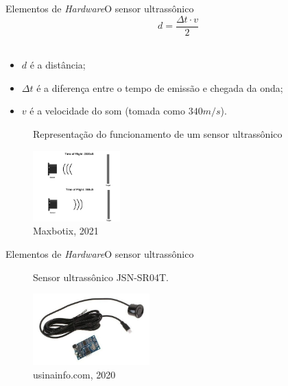 \begin{frame}{Elementos de \textit{Hardware}}{O sensor ultrassônico}
    \begin{equation}
        d = \frac{\Delta t \cdot v}{2}
        \end{equation}
        \\
        \begin{itemize}
            
            \item $d$ é a distância;
            \item $\Delta t$ é a diferença entre o tempo de emissão e chegada da onda;
            \item  $v$ é a velocidade do som (tomada como $340m/s$). \\
        \end{itemize}

        \begin{figure}[H]
            \centering
            \caption{Representação do funcionamento de um sensor ultrassônico}
            \includegraphics[width=0.3\textwidth]{figuras/ultrassonico_operacao.png}
            \caption*{\tiny{Maxbotix, 2021}}
            \label{fig:operacao_ultrassonico}
        \end{figure}
        
\end{frame}

\begin{frame}{Elementos de \textit{Hardware}}{O sensor ultrassônico}
  
\begin{figure}[H]
	\centering
	\caption{Sensor ultrassônico JSN-SR04T.}
	\includegraphics[width=0.4\textwidth]{figuras/sensor_ultra.jpg}
	\caption*{\tiny{usinainfo.com}, 2020}
	\label{fig:sensor_ultra}
\end{figure}
        
\end{frame}

